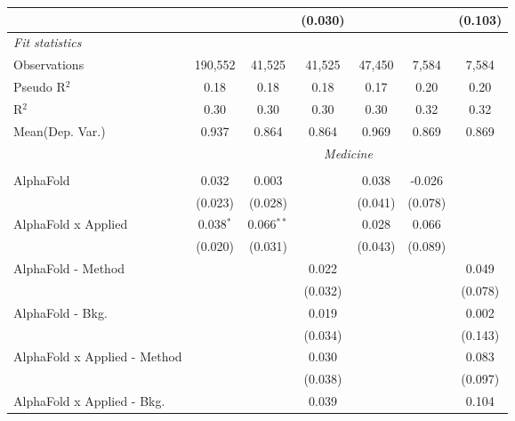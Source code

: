 \begin{tabular}{lcccccc}
                                  &               &               & (0.030)        &              &              & (0.103)\\   
   \midrule
   \emph{Fit statistics}\\
   Observations                   & 190,552       & 41,525        & 41,525         & 47,450       & 7,584        & 7,584\\  
   Pseudo R$^2$                   & 0.18          & 0.18          & 0.18           & 0.17         & 0.20         & 0.20\\  
   R$^2$                          & 0.30          & 0.30          & 0.30           & 0.30         & 0.32         & 0.32\\  
   
Mean(Dep. Var.) & 0.937 & 0.864 & 0.864 & 0.969 & 0.869 & 0.869 \\
 & \multicolumn{6}{c}{\textit{Medicine}} \\ \\
   AlphaFold                      & 0.032         & 0.003        &             & 0.038        & -0.026  &   \\   
                                  & (0.023)       & (0.028)      &             & (0.041)      & (0.078) &   \\   
   AlphaFold x Applied            & 0.038$^{*}$   & 0.066$^{**}$ &             & 0.028        & 0.066   &   \\   
                                  & (0.020)       & (0.031)      &             & (0.043)      & (0.089) &   \\   
   AlphaFold - Method             &               &              & 0.022       &              &         & 0.049\\   
                                  &               &              & (0.032)     &              &         & (0.078)\\   
   AlphaFold - Bkg.               &               &              & 0.019       &              &         & 0.002\\   
                                  &               &              & (0.034)     &              &         & (0.143)\\   
   AlphaFold x Applied - Method   &               &              & 0.030       &              &         & 0.083\\   
                                  &               &              & (0.038)     &              &         & (0.097)\\   
   AlphaFold x Applied - Bkg.     &               &              & 0.039       &              &         & 0.104\\   

\end{tabular}
